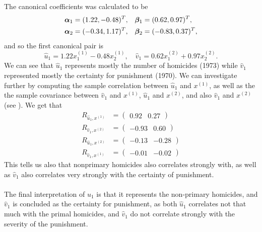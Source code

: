 The canonical coefficients  was calculated to be
\begin{align*}
  \bm{\alpha}_{1} &=  (1.22, -0.48)^{T},  &\bm{\beta}_{1} &=  (0.62, 0.97)^{T}, \\
  \bm{\alpha}_{2} &=  (-0.34, 1.17)^{T},  &\bm{\beta}_{2} &= (-0.83, 0.37)^{T},
\end{align*}
and so the first canonical pair is
\begin{equation*}
  \hat u_1 = 1.22 x_{1}^{(1)} - 0.48 x_{2}^{(1)} , \quad \hat v_{1} =
  0.62 x_{1}^{(2)} + 0.97 x_{2}^{(2)}. 
\end{equation*}
We can see that $\hat u_{1}$ represents mostly the number of homicides
 (1973) while $\hat v_{1}$ represented mostly the certainty for
 punishment (1970). We can investigate further by computing the sample
 correlation between $\hat u_{1}$ and $x^{(1)}$, as well as the the
 sample covariance between $\hat v_{1}$ and $x^{(1)}$, $\hat u_{1}$ and
 $x^{(2)}$, and also $\hat v_{1}$ and  $x^{(2)}$ (see \cite[p. 552]{book}). We get that
 \begin{align*}
   R_{\hat u_{1}, x^{(1)}} &= \begin{pmatrix}0.92 &0.27   \end{pmatrix} \\
   R_{\hat v_{1}, x^{(2)}} &= \begin{pmatrix}-0.93 &0.60   \end{pmatrix} \\
   R_{\hat u_{1}, x^{(2)}} &= \begin{pmatrix}-0.13 &-0.28 \end{pmatrix} \\   
   R_{\hat v_{1}, x^{(1)}} &= \begin{pmatrix}-0.01 &-0.02   \end{pmatrix} 
 \end{align*}
This tells us also that nonprimary homicides also correlates strongly
with, as well as $\hat v_{1}$ also correlates very strongly with the
certainty of punishment.\\
\\
The final interpretation of $\hat u_{1}$ is that it represents the
non-primary homicides, and $\hat v_{1}$ is concluded as the certainty
for punishment, as both $\hat u_{1}$ correlates not that much with the
primal homicides, and $\hat v_{1}$ do not correlate strongly with the
severity of the punishment.



